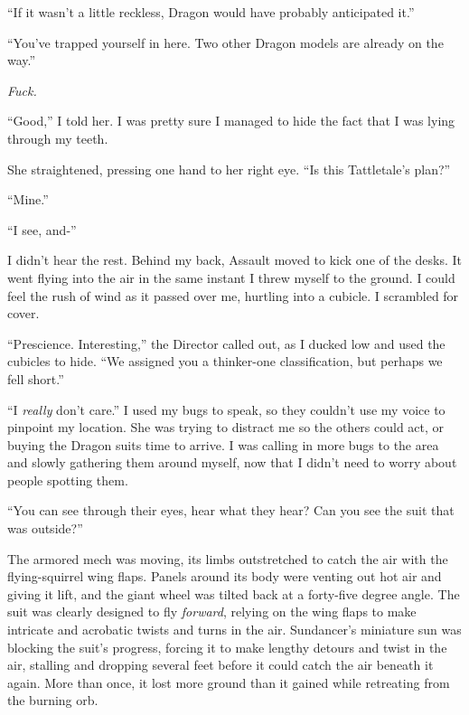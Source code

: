 ``If it wasn't a little reckless, Dragon would have probably anticipated it.''



``You've trapped yourself in here.  Two other Dragon models are already on the way.''



\emph{Fuck.}



``Good,'' I told her.  I was pretty sure I managed to hide the fact that I was lying through my teeth.



She straightened, pressing one hand to her right eye.  ``Is this Tattletale's plan?''



``Mine.''



``I see, and-''



I didn't hear the rest.  Behind my back, Assault moved to kick one of the desks.  It went flying into the air in the same instant I threw myself to the ground.  I could feel the rush of wind as it passed over me, hurtling into a cubicle.  I scrambled for cover.



``Prescience.  Interesting,'' the Director called out, as I ducked low and used the cubicles to hide.  ``We assigned you a thinker-one classification, but perhaps we fell short.''



``I \emph{really} don't care.''  I used my bugs to speak, so they couldn't use my voice to pinpoint my location.  She was trying to distract me so the others could act, or buying the Dragon suits time to arrive.  I was calling in more bugs to the area and slowly gathering them around myself, now that I didn't need to worry about people spotting them.



``You can see through their eyes, hear what they hear?  Can you see the suit that was outside?''



The armored mech was moving, its limbs outstretched to catch the air with the flying-squirrel wing flaps.  Panels around its body were venting out hot air and giving it lift, and the giant wheel was tilted back at a forty-five degree angle.  The suit was clearly designed to fly \emph{forward}, relying on the wing flaps to make intricate and acrobatic twists and turns in the air.  Sundancer's miniature sun was blocking the suit's progress, forcing it to make lengthy detours and twist in the air, stalling and dropping several feet before it could catch the air beneath it again.  More than once, it lost more ground than it gained while retreating from the burning orb.



